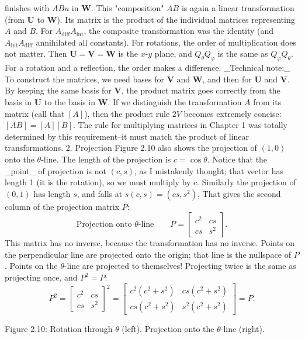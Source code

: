 finishes with \(ABu\) in \(\mathbf{W}\). This "composition" \(AB\) is again a linear transformation (from \(\mathbf{U}\) to \(\mathbf{W}\)). Its matrix is the product of the individual matrices representing \(A\) and \(B\). For \(A_{\mathrm{diff}}A_{\mathrm{int}}\), the composite transformation was the identity (and \(A_{\mathrm{int}}A_{\mathrm{diff}}\) annihilated all constants). For rotations, the order of multiplication does not matter. Then \(\mathbf{U}=\mathbf{V}=\mathbf{W}\) is the \(x\)-\(y\) plane, and \(Q_{\theta}Q_{\varphi}\) is the same as \(Q_{\varphi}Q_{\theta}\). For a rotation and a reflection, the order makes a difference. _Technical note:_ To construct the matrices, we need bases for \(\mathbf{V}\) and \(\mathbf{W}\), and then for \(\mathbf{U}\) and \(\mathbf{V}\). By keeping the same basis for \(\mathbf{V}\), the product matrix goes correctly from the basis in \(\mathbf{U}\) to the basis in \(\mathbf{W}\). If we distinguish the transformation \(A\) from its matrix (call that \([A]\)), then the product rule \(2V\) becomes extremely concise: \([AB]=[A][B]\). The rule for multiplying matrices in Chapter 1 was totally determined by this requirement--it must match the product of linear transformations.
2. Projection Figure 2.10 also shows the projection of \((1,0)\) onto the \(\theta\)-line. The length of the projection is \(c=\cos\theta\). Notice that the _point_ of projection is not \((c,s)\), as I mistakenly thought; that vector has length 1 (it is the rotation), so we must multiply by \(c\). Similarly the projection of \((0,1)\) has length \(s\), and falls at \(s(c,s)=(cs,s^{2})\), That gives the second column of the projection matrix \(P\): \[\text{{Projection onto $\theta$-line}}\qquad P=\begin{bmatrix}c^{2}&cs\\ cs&s^{2}\end{bmatrix}.\] This matrix has no inverse, because the transformation has no inverse. Points on the perpendicular line are projected onto the origin; that line is the nullspace of \(P\). Points on the \(\theta\)-line are projected to themselves! Projecting twice is the same as projecting once, and \(P^{2}=P\): \[P^{2}=\begin{bmatrix}c^{2}&cs\\ cs&s^{2}\end{bmatrix}^{2}=\begin{bmatrix}c^{2}(c^{2}+s^{2})&cs(c^{2}+s^{2})\\ cs(c^{2}+s^{2})&s^{2}(c^{2}+s^{2})\end{bmatrix}=P.\]

Figure 2.10: Rotation through \(\theta\) (left). Projection onto the \(\theta\)-line (right).

 